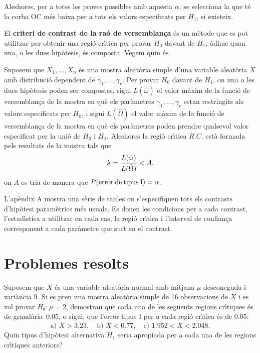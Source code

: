 Aleshores, per a totes les proves possibles amb aquesta $\alpha$, se selecciona
la que t\'e la corba OC m\'es baixa per a tots els valors especificats per $H_1$, si
existeix.

El {\bf criteri de contrast de la ra\'o de versemblan\c ca}
\'es un m\`etode que es pot utilitzar per obtenir una regi\'o cr\'{\i}tica
per provar $H_0$ davant de $H_1$, \`adhuc quan una, o les dues hip\`otesis, \'es composta. Vegem quin \'es.

Suposem que $X_1, \ldots , X_n$ \'es una mostra aleat\`oria simple d'una 
variable aleat\`oria $X$ amb distribuci\'o dependent de $\gamma_1, \ldots , \gamma_r$. Per
provar $H_0$ davant de $H_1$, on una o les dues hip\`otesis poden ser 
compostes, sigui $L(\hat{\omega})$ el valor m\`axim de la funci\'o de 
versemblan\c ca de la mostra en qu\`e els par\`ametres
 $\gamma_1, \ldots , \gamma_r$ estan restringits als valors
especificats per $H_0$, i sigui $L(\hat{\Omega})$ el valor m\`axim de la funci\'o de
versemblan\c ca de la mostra en qu\`e els par\`ametres poden prendre qualsevol valor
especificat per la uni\'o de $H_0$ i $H_1$. Aleshores 
la regi\'o cr\'{\i}tica $R.C.$ est\`a
formada pels resultats de la mostra tals que
$$\lambda = {L(\hat{\omega}) \over L(\hat{\Omega})} < A,$$
on $A$ es tria de manera que $P(\rm{error \> de \> tipus \> I}) = \alpha$.

L'ap\`endix A mostra una s\`erie de taules on s'especifiquen tots els contrasts
d'hip\`o\-tesi param\`etrics m\'es usuals. 
Es donen les condicions per a cada contrast,
l'estad\'{\i}s\-tica 
a utilitzar en cada cas, la regi\'o cr\'{\i}tica 
i l'interval de confian\c{c}a 
corresponent a cada par\`ametre que surt en el contrast.

\newpage

\section{Problemes resolts}

\begin{probres}
{Suposem que $X$ \'es una variable aleat\`oria normal amb mitjana $\mu$ desconeguda i
vari\`ancia $9$. Si es pren una mostra aleat\`oria simple de 16 observacions de $X$ i es vol provar
$H_0:\mu=2$, demostrau que cada una de les seg\"uents regions cr\'{\i}tiques 
\'es de grand\`aria~$0.05$, o sigui, que l'error tipus I per a cada regi\'o cr\'{\i}tica \'es de
$0.05$:
$$\mbox{a) } \overline{X}>3.23,\quad \mbox{b) } \overline{X}<0.77,\quad
\mbox{c) } 1.952<\overline{X}<2.048.$$Quin tipus d'hip\`otesi alternativa $H_1$
seria apropiada per a cada una de les regions cr\'{\i}tiques anteriors?}
\end{probres}

